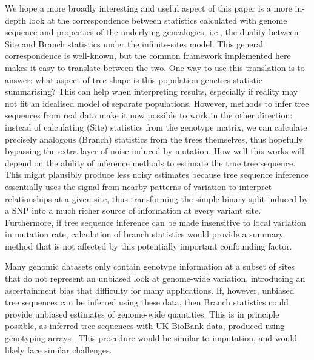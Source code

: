 \documentclass{article}
\begin{document}
We hope a more broadly interesting and useful aspect of this paper
is a more in-depth look at the correspondence between statistics calculated with genome sequence
and properties of the underlying genealogies, i.e.,
the duality between Site and Branch statistics under the infinite-sites model.
This general correspondence is well-known,
but the common framework implemented here makes it easy to translate between the two.
One way to use this translation is to answer:
what aspect of tree shape is this population genetics statistic summarising?
This can help when interpreting results, especially if reality may not fit an idealised model
of separate populations.
However, methods to infer tree sequences from real data
make it now possible to work in the other direction:
instead of calculating (Site) statistics from the genotype matrix,
we can calculate precisely analogous (Branch) statistics from the trees themselves,
thus hopefully bypassing the extra layer of noise induced by mutation.
How well this works will depend on the ability of inference methods
to estimate the true tree sequence.
This might plausibly produce less noisy estimates because tree sequence inference
essentially uses the signal from nearby patterns of variation
to interpret relationships at a given site,
thus transforming the simple binary split induced by a SNP
into a much richer source of information at every variant site.
Furthermore,
if tree sequence inference can be made insensitive to local variation in mutation rate,
calculation of branch statistics would provide a summary method
that is not affected by this potentially important confounding factor.

Many genomic datasets only contain genotype information at a subset of sites
that do not represent an unbiased look at genome-wide variation,
introducing an ascertainment bias that difficulty for many applications.
If, however, unbiased tree sequences can be inferred using these data,
then Branch statistics could provide unbiased estimates of genome-wide quantities.
This is in principle possible, as \citet{kelleher2019inferring} inferred tree sequences
with UK BioBank data, produced using genotyping arrays \citep{bycroft2018genome}.
This procedure would be similar to imputation, and would likely face similar challenges.
\end{document}
